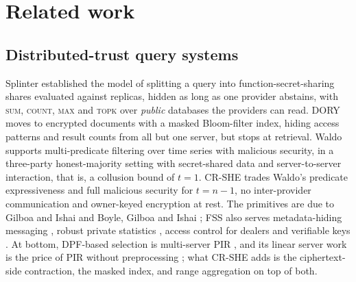 \documentclass[a4paper,fleqn]{cas-sc}
\begin{document}
\section{Related work}
\label{sec:related}

\subsection{Distributed-trust query systems}
Splinter \citep{splinter} established the model of splitting a query into
function-secret-sharing shares evaluated against replicas, hidden as long as
one provider abstains, with \textsc{sum}, \textsc{count}, \textsc{max} and
\textsc{topk} over \emph{public} databases the providers can read. DORY
\citep{dory} moves to encrypted documents with a masked Bloom-filter index,
hiding access patterns and result counts from all but one server, but stops at
retrieval. Waldo \citep{waldo} supports multi-predicate filtering over
time series with malicious security, in a three-party honest-majority setting
with secret-shared data and server-to-server interaction, that is, a
collusion bound of $t=1$. CR-SHE trades Waldo's predicate expressiveness and
full malicious security for $t=n-1$, no inter-provider communication and
owner-keyed encryption at rest. The primitives are due to Gilboa and Ishai
\citep{gilboa2014distributed} and Boyle, Gilboa and Ishai
\citep{boyle2015function,boyle2016function}; FSS also serves metadata-hiding
messaging \citep{express}, robust private statistics
\citep{corrigan2017prio,boneh2021lightweight}, access control for dealers
\citep{pacl} and verifiable keys \citep{decastro2022lightweight}. At bottom,
DPF-based selection is multi-server PIR \citep{chor1998private}, and its linear
server work is the price of PIR without preprocessing
\citep{beimel2000reducing}; what CR-SHE adds is the ciphertext-side
contraction, the masked index, and range aggregation on top of both.
\end{document}
